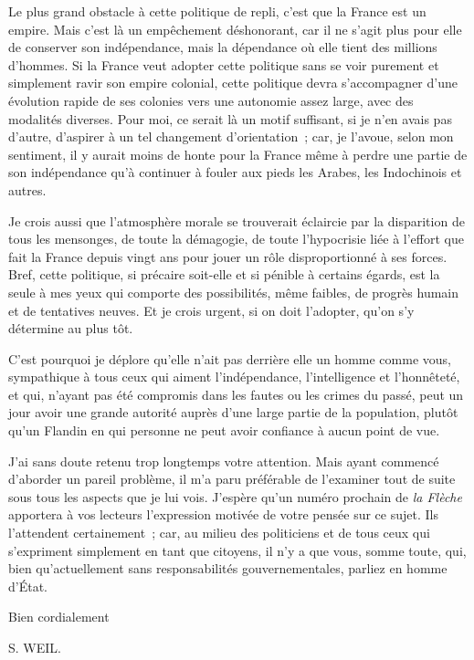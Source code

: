 \documentclass[french,twoside]{book} %
\begin{document}
Le plus grand obstacle à cette politique de repli, c'est que la France est un empire. Mais c'est là un empêchement déshonorant, car il ne s'agit plus pour elle de conserver son indépendance, mais la dépendance où elle tient des millions d'hommes. Si la France veut adopter cette politique sans se voir pure­ment et simplement ravir son empire colonial, cette politique devra s'accom­pagner d'une évolution rapide de ses colonies vers une autonomie assez large, avec des modalités diverses. Pour moi, ce serait là un motif suffisant, si je n'en avais pas d'autre, d'aspirer à un tel changement d'orientation ; car, je l'avoue, selon mon sentiment, il y aurait moins de honte pour la France même à perdre une partie de son indépendance qu'à continuer à fouler aux pieds les Arabes, les Indochinois et autres.\par
Je crois aussi que l'atmosphère morale se trouverait éclaircie par la disparition de tous les mensonges, de toute la démagogie, de toute l'hypocrisie liée à l'effort que fait la France depuis vingt ans pour jouer un rôle dispro­portionné à ses forces. Bref, cette politique, si précaire soit-elle et si pénible à certains égards, est la seule à mes yeux qui comporte des possibilités, même faibles, de progrès humain et de tentatives neuves. Et je crois urgent, si on doit l'adopter, qu'on s'y détermine au plus tôt.\par
C'est pourquoi je déplore qu'elle n'ait pas derrière elle un homme comme vous, sympathique à tous ceux qui aiment l'indépendance, l'intelligence et l'honnêteté, et qui, n'ayant pas été compromis dans les fautes ou les crimes du passé, peut un jour avoir une grande autorité auprès d'une large partie de la population, plutôt qu'un Flandin en qui personne ne peut avoir confiance à aucun point de vue.\par
J'ai sans doute retenu trop longtemps votre attention. Mais ayant com­mencé d'aborder un pareil problème, il m'a paru préférable de l'examiner tout de suite sous tous les aspects que je lui vois. J'espère qu'un numéro prochain de {\itshape la Flèche} apportera à vos lecteurs l'expression motivée de votre pensée sur ce sujet. Ils l'attendent certainement ; car, au milieu des politiciens et de tous ceux qui s'expriment simplement en tant que citoyens, il n'y a que vous, somme toute, qui, bien qu'actuellement sans responsabilités gouvernemen­tales, parliez en homme d'État.\par
Bien cordialement\par
S. WEIL.\par
\end{document}
